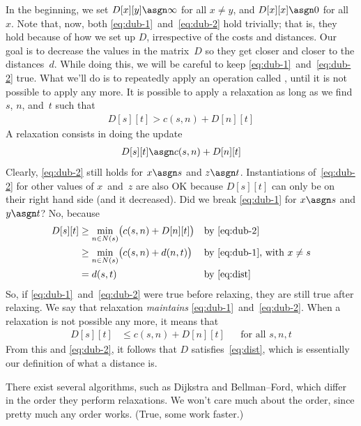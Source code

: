 In the beginning,
  we set $D[x][y] \asgn \infty$ for all $x \ne y$,
  and $D[x][x] \asgn 0$ for all~$x$.
Note that, now, both \eqref{eq:dub-1}~and~\eqref{eq:dub-2} hold trivially;
  that is, they hold because of how we set up $D$,
    irrespective of the costs and distances.
Our goal is to decrease the values in the matrix~$D$
  so they get closer and closer to the distances~$d$.
While doing this,
  we will be careful to keep \eqref{eq:dub-1}~and~\eqref{eq:dub-2} true.
What we'll do is to repeatedly apply an operation called ,
  until it is not possible to apply any more.
It is possible to apply a relaxation as long as we find $s$, $n$, and~$t$
  such that
\begin{align}
  D[s][t] > c(s,n) + D[n][t]
\end{align}
A relaxation consists in doing the update
\begin{align}
  D[s][t] \asgn c(s,n) + D[n][t]
\end{align}
Clearly, \eqref{eq:dub-2} still holds for $x\asgn s$ and $z\asgn t$.
Instantiations of~\eqref{eq:dub-2} for other values of $x$~and~$z$ are also OK
  because $D[s][t]$ can only be on their right hand side (and it decreased).
Did we break \eqref{eq:dub-1} for $x\asgn s$ and $y \asgn t$?
No, because
\begin{align*}
D[s][t]
  &\ge \min_{n\in N(s)} \bigl(c(s,n)+D[n][t]\bigr)
    &&\text{by \eqref{eq:dub-2}}
\\
  &\ge \min_{n\in N(s)} \bigl(c(s,n)+d(n,t)\bigr)
    &&\text{by \eqref{eq:dub-1}, with $x\ne s$}
\\
  &= d(s,t)
    &&\text{by \eqref{eq:dist}}
\end{align*}
So, if \eqref{eq:dub-1}~and~\eqref{eq:dub-2} were true before relaxing,
  they are still true after relaxing.
We say that relaxation \emph{maintains} \eqref{eq:dub-1}~and~\eqref{eq:dub-2}.
When a relaxation is not possible any more, it means that
\begin{align}
  D[s][t] &\le c(s,n) + D[n][t]
  &&\text{for all $s,n,t$}
\end{align}
From this and \eqref{eq:dub-2},
  it follows that $D$ satisfies~\eqref{eq:dist},
  which is essentially our definition of what a distance is.

There exist several algorithms, such as Dijkstra and Bellman--Ford,
  which differ in the order they perform relaxations.
We won't care much about the order,
  since pretty much any order works.
(True, some work faster.)

\medskip

